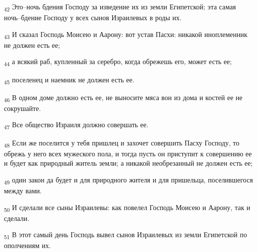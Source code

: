 \begin{tcolorbox}
\textsubscript{42} Это--ночь бдения Господу за изведение их из земли Египетской; эта самая ночь--бдение Господу у всех сынов Израилевых в роды их.
\end{tcolorbox}
\begin{tcolorbox}
\textsubscript{43} И сказал Господь Моисею и Аарону: вот устав Пасхи: никакой иноплеменник не должен есть ее;
\end{tcolorbox}
\begin{tcolorbox}
\textsubscript{44} а всякий раб, купленный за серебро, когда обрежешь его, может есть ее;
\end{tcolorbox}
\begin{tcolorbox}
\textsubscript{45} поселенец и наемник не должен есть ее.
\end{tcolorbox}
\begin{tcolorbox}
\textsubscript{46} В одном доме должно есть ее, не выносите мяса вон из дома и костей ее не сокрушайте.
\end{tcolorbox}
\begin{tcolorbox}
\textsubscript{47} Все общество Израиля должно совершать ее.
\end{tcolorbox}
\begin{tcolorbox}
\textsubscript{48} Если же поселится у тебя пришлец и захочет совершить Пасху Господу, то обрежь у него всех мужеского пола, и тогда пусть он приступит к совершению ее и будет как природный житель земли; а никакой необрезанный не должен есть ее;
\end{tcolorbox}
\begin{tcolorbox}
\textsubscript{49} один закон да будет и для природного жителя и для пришельца, поселившегося между вами.
\end{tcolorbox}
\begin{tcolorbox}
\textsubscript{50} И сделали все сыны Израилевы: как повелел Господь Моисею и Аарону, так и сделали.
\end{tcolorbox}
\begin{tcolorbox}
\textsubscript{51} В этот самый день Господь вывел сынов Израилевых из земли Египетской по ополчениям их.
\end{tcolorbox}
